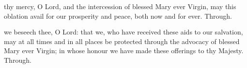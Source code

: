 
\secret
{} thy mercy, O Lord, and the intercession of blessed Mary ever Virgin, may this oblation avail for our prosperity and peace, both now and for ever. Through.


\postcommunion
{} we beseech thee, O Lord: that we, who have received these aids to our salvation, may at all times and in all places be protected through the advocacy of blessed Mary ever Virgin; in whose honour we have made these offerings to thy Majesty. Through.

